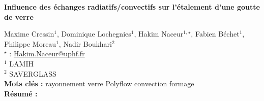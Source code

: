 


    \newpage


%
\begin{flushleft}
\addtocounter{section}{1}
{\Large \textbf{Influence des échanges radiatifs/convectifs sur l'étalement d'une goutte de verre}}\label{ref:25}
\end{flushleft}
%
Maxime Cressin$^{1}$, Dominique Lochegnies$^{1}$, Hakim Naceur$^{1,\star}$, Fabien Béchet$^{1}$, Philippe Moreau$^{1}$, Nadir Boukhari$^{2}$\\[2mm]
$^{\star}$ \Letter : \url{Hakim.Naceur@uphf.fr}\\[2mm]
{\footnotesize $^{1}$ LAMIH}\\
{\footnotesize $^{2}$ SAVERGLASS}\\
[4mm]
%
\noindent \textbf{Mots clés : } rayonnement verre Polyflow convection formage\\[4mm]
%
\noindent \textbf{Résumé : } 


